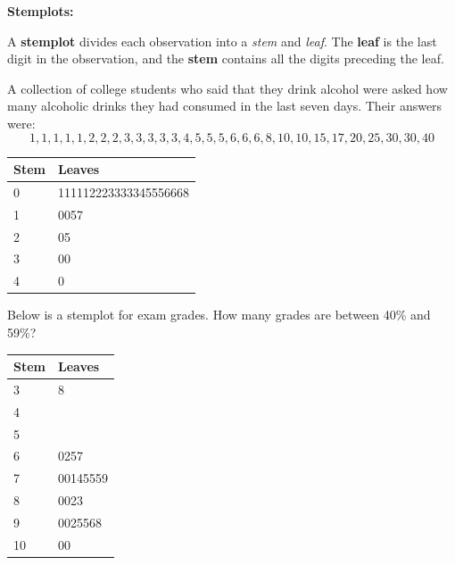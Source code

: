 \documentclass[../mathNotesPreamble]{subfiles}
\begin{document}
  {\noindent\Large\textbf{Stemplots:}}
  \begin{defn*}
    A \textbf{stemplot} divides each observation into a \emph{stem} and \emph{leaf}. The \textbf{leaf} is the last digit in the observation, and the \textbf{stem} contains all the digits preceding the leaf.
  \end{defn*}
  \begin{ex*}
    A collection of college students who said that they drink alcohol were asked how many alcoholic drinks they had consumed in the last seven days. Their answers were:
    \[1, 1, 1, 1, 1, 2, 2, 2, 3, 3, 3, 3, 3, 4, 5, 5, 5, 6, 6, 6, 8, 10, 10, 15, 17, 20, 25, 30, 30, 40\]
  \end{ex*}
  \begin{center}
    \begin{tabular}{@{}ll@{}}\toprule
      Stem& Leaves\\\midrule
      0& 111112223333345556668\\
      1& 0057\\
      2& 05\\
      3& 00\\
      4& 0\\\bottomrule
    \end{tabular}
  \end{center}

  \begin{ex*}
    Below is a stemplot for exam grades. How many grades are between 40\% and 59\%?
  \end{ex*}
  \begin{center}
    \begin{tabular}{@{}ll@{}}\toprule
      Stem& Leaves\\\midrule
      3& 8\\
      4& \\
      5& \\
      6& 0257\\
      7& 00145559\\
      8& 0023\\
      9& 0025568\\
      10& 00\\\bottomrule
    \end{tabular}
  \end{center}

  \pagebreak
\end{document}
